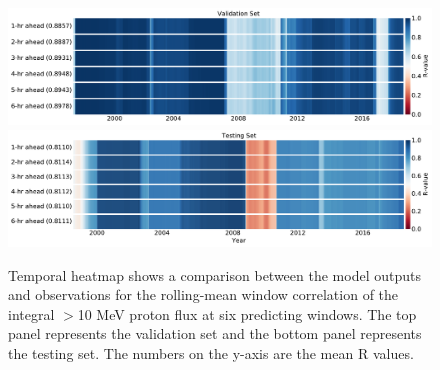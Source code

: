 \begin{figure}[!htp]
	\centering
	\includegraphics[width=\textwidth]{chapter4/figs/hourly_PF10/temporal_heatmap_val.pdf}
	\includegraphics[width=\textwidth]{chapter4/figs/hourly_PF10/temporal_heatmap_test.pdf}
	\caption{Temporal heatmap shows a comparison between the model outputs and observations for the rolling-mean window correlation of the integral $>$10 MeV proton flux at six predicting windows. The top panel represents the validation set and the bottom panel represents the testing set. The numbers on the y-axis are the mean R values.}
	\label{fig_temp_heatmap_valtest}
\end{figure}

